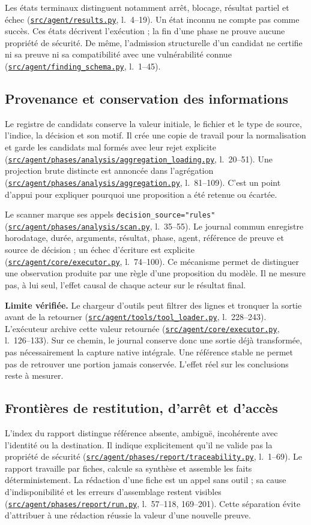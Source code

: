 \documentclass[11pt,a4paper]{article}
\newcommand{\code}[1]{\nolinkurl{#1}}
\newcommand{\src}[2]{{\small\href{../../#1}{\nolinkurl{#1}}, l.~#2}}
\begin{document}
Les états terminaux distinguent notamment arrêt, blocage, résultat partiel et
échec (\src{src/agent/results.py}{4--19}). Un état inconnu ne compte pas comme
succès. Ces états décrivent l'exécution ; la fin d'une phase ne prouve aucune
propriété de sécurité. De même, l'admission structurelle d'un candidat ne
certifie ni sa preuve ni sa compatibilité avec une vulnérabilité connue
(\src{src/agent/finding_schema.py}{1--45}).

\subsection{Provenance et conservation des informations}
Le registre de candidats conserve la valeur initiale, le fichier et le type de
source, l'indice, la décision et son motif. Il crée une copie de travail pour la
normalisation et garde les candidats mal formés avec leur rejet explicite
(\src{src/agent/phases/analysis/aggregation_loading.py}{20--51}). Une projection
brute distincte est annoncée dans l'agrégation
(\src{src/agent/phases/analysis/aggregation.py}{81--109}). C'est un point
d'appui pour expliquer pourquoi une proposition a été retenue ou écartée.

Le scanner marque ses appels \code{decision_source="rules"}
(\src{src/agent/phases/analysis/scan.py}{35--55}). Le journal commun enregistre
horodatage, durée, arguments, résultat, phase, agent, référence de preuve et
source de décision ; un échec d'écriture est explicite
(\src{src/agent/core/executor.py}{74--100}). Ce mécanisme permet de distinguer
une observation produite par une règle d'une proposition du modèle. Il ne
mesure pas, à lui seul, l'effet causal de chaque acteur sur le résultat final.

\textbf{Limite vérifiée.} Le chargeur d'outils peut filtrer des lignes et
tronquer la sortie avant de la retourner
(\src{src/agent/tools/tool_loader.py}{228--243}). L'exécuteur archive cette
valeur retournée (\src{src/agent/core/executor.py}{126--133}). Sur ce chemin,
le journal conserve donc une sortie déjà transformée, pas nécessairement la
capture native intégrale. Une référence stable ne permet pas de retrouver une
portion jamais conservée. L'effet réel sur les conclusions reste à mesurer.

\subsection{Frontières de restitution, d'arrêt et d'accès}
L'index du rapport distingue référence absente, ambiguë, incohérente avec
l'identité ou la destination. Il indique explicitement qu'il ne valide pas la
propriété de sécurité (\src{src/agent/phases/report/traceability.py}{1--69}).
Le rapport travaille par fiches, calcule sa synthèse et assemble les faits
déterministement. La rédaction d'une fiche est un appel sans outil ; sa cause
d'indisponibilité et les erreurs d'assemblage restent visibles
(\src{src/agent/phases/report/run.py}{57--118, 169--201}). Cette séparation
évite d'attribuer à une rédaction réussie la valeur d'une nouvelle preuve.
\end{document}
